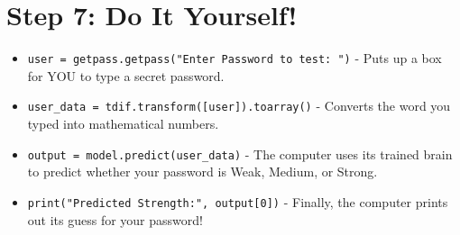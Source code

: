\documentclass{article}
\begin{document}
\section*{Step 7: Do It Yourself!}
\begin{itemize}
    \item \texttt{user = getpass.getpass("Enter Password to test: ")} - Puts up a box for YOU to type a secret password.
    \item \texttt{user\_data = tdif.transform([user]).toarray()} - Converts the word you typed into mathematical numbers.
    \item \texttt{output = model.predict(user\_data)} - The computer uses its trained brain to predict whether your password is Weak, Medium, or Strong.
    \item \texttt{print("Predicted Strength:", output[0])} - Finally, the computer prints out its guess for your password!
\end{itemize}
\end{document}
